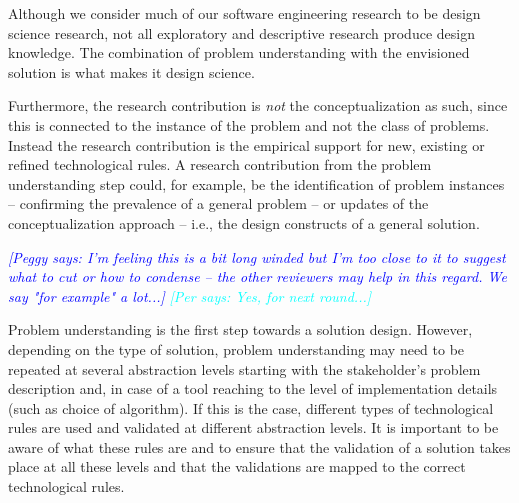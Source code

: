 \documentclass[graybox]{svmult}
\newcommand{\peggy}[1]{\textcolor{blue}{{\it [Peggy says: #1]}}}
\newcommand{\per}[1]{\textcolor{cyan}{{\it [Per says: #1]}}}
\newcommand{\peggy}[1]{}
\newcommand{\per}[1]{}
\begin{document}
Although we consider much of our software engineering research to be design science research, not all exploratory and descriptive research produce design knowledge. The combination of problem understanding with the envisioned solution is what makes it design science.


Furthermore, the research contribution is \emph{not} the conceptualization as such, since this is connected to the instance of the problem and not the class of problems. Instead the research contribution is the empirical support for new, existing or refined technological rules. A research contribution from the problem understanding step could, for example, be the identification of problem instances -- confirming the prevalence of a general problem -- or updates of the conceptualization approach -- i.e., the design constructs of a general solution.

\peggy{I'm feeling this is a bit long winded but I'm too close to it to suggest what to cut or how to condense -- the other reviewers may help in this regard.  We say "for example" a lot...} \per{Yes, for next round...}


Problem understanding is the first step towards a solution design. However, depending on the type of solution, problem understanding may need to be repeated at several abstraction levels starting with the stakeholder's problem description and, in case of a tool reaching to the level of implementation details (such as  choice of algorithm). If this is the case, different types of technological rules are used and validated at different abstraction levels. It is important to be aware of what these rules are and to ensure that the validation of a solution takes place at all these levels and that the validations are mapped to the correct technological rules. 
\end{document}
